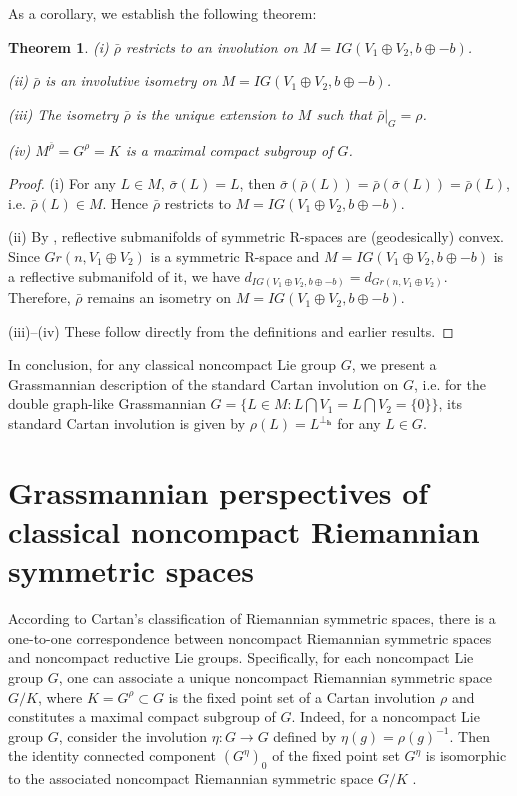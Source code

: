 \documentclass{article}
\newtheorem{thm}{Theorem}[section]
\begin{document}
As a corollary, we establish the following theorem:
\begin{thm}
(i) $\bar{\rho}$ restricts to an involution on $M=IG(V_1 \oplus V_2, b\oplus-b)$.

(ii) $\bar{\rho}$ is an involutive isometry on $M=IG(V_1 \oplus V_2, b\oplus-b)$.

(iii) The isometry $\bar{\rho}$ is the unique extension to $M$ such that  $\bar{\rho}|_G=\rho$.

(iv)  $M^{\bar{\rho}}=G^{\rho}=K$ is a maximal compact subgroup of $G$.
\end{thm}
\begin{proof}
(i) For any $L \in M$, $\bar{\sigma}(L)=L$, then $\bar{\sigma}(\bar{\rho}(L))=\bar{\rho}(\bar{\sigma}(L))=\bar{\rho}(L)$,
i.e. $\bar{\rho}(L) \in M$. Hence $\bar{\rho}$  restricts to $M=IG(V_1 \oplus V_2, b\oplus-b)$.

(ii) By \cite{QT}, reflective submanifolds of symmetric R-spaces are (geodesically) convex. Since $Gr(n, V_1\oplus V_2)$ is a symmetric R-space and $M=IG(V_1 \oplus V_2, b\oplus-b)$ is a reflective submanifold of it, we
have $d_{IG(V_1 \oplus V_2, b\oplus-b)}=d_{Gr(n, V_1\oplus V_2)}$. Therefore,  $\bar{\rho}$ remains an isometry on $M=IG(V_1 \oplus V_2, b\oplus-b)$.

(iii)--(iv) These follow directly from the definitions and earlier results.
\end{proof}

In conclusion, for any classical noncompact Lie group $G$, we present a Grassmannian description of the standard Cartan involution on $G$, i.e. for the double graph-like Grassmannian
$G= \{L \in M: L \bigcap V_1=L \bigcap V_2=\{0\}\}$, its standard Cartan involution is given by $\rho(L)=L^{\perp_{\mathbf{h}}}$ for any $L \in G$.


\bigskip
\section{{\large Grassmannian perspectives of classical noncompact Riemannian symmetric spaces}}
According to Cartan's classification of Riemannian symmetric spaces, there is a one-to-one correspondence between noncompact Riemannian symmetric spaces and noncompact reductive Lie groups. Specifically, for each noncompact Lie group $G$, one can associate a unique noncompact Riemannian symmetric space $G/K$, where $K=G^{\rho}\subset G$ is the fixed point set of a Cartan involution $\rho$ and constitutes a maximal compact subgroup of $G$.
Indeed, for a noncompact Lie group $G$,  consider the involution $\eta: G \rightarrow G$ defined by  $\eta(g)=\rho(g)^{-1}$. Then the identity connected component $(G^{\eta})_0$ of the fixed point set $G^{\eta}$ is isomorphic to the associated noncompact Riemannian symmetric space
$G/K$ \cite{Loos}.
\end{document}
